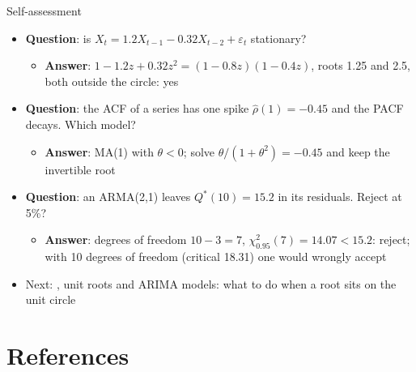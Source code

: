 \begin{frame}{Self-assessment}
\itemsize{\small}
\begin{itemize}
    \item \textbf{Question}: is $X_t = 1.2X_{t-1} - 0.32X_{t-2} + \varepsilon_t$ stationary?
    \begin{itemize}
        \item \textbf{Answer}: $1 - 1.2z + 0.32z^2 = (1 - 0.8z)(1 - 0.4z)$, roots 1.25 and 2.5, both outside the circle: yes
    \end{itemize}
    \item \textbf{Question}: the ACF of a series has one spike $\hat\rho(1) = -0.45$ and the PACF decays. Which model?
    \begin{itemize}
        \item \textbf{Answer}: MA(1) with $\theta < 0$; solve $\theta/(1 + \theta^2) = -0.45$ and keep the invertible root
    \end{itemize}
    \item \textbf{Question}: an ARMA(2,1) leaves $Q^*(10) = 15.2$ in its residuals. Reject at 5\%?
    \begin{itemize}
        \item \textbf{Answer}: degrees of freedom $10 - 3 = 7$, $\chi^2_{0.95}(7) = 14.07 < 15.2$: reject; with 10 degrees of freedom (critical 18.31) one would wrongly accept
    \end{itemize}
    \item Next: , unit roots and ARIMA models: what to do when a root sits on the unit circle
\end{itemize}
\end{frame}


\section{References}

